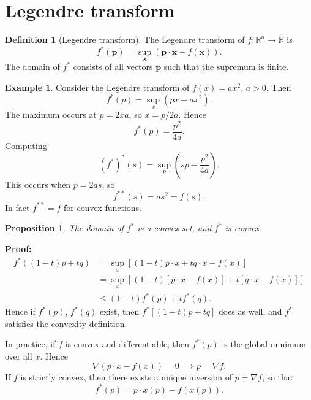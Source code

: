 \documentclass[12pt]{article}
\newtheorem{proposition}{Proposition}[section]
\theoremstyle{definition}
\newtheorem{definition}{Definition}[section]
\newtheorem{example}{Example}[section]
\theoremstyle{remark}
\begin{document}
\newpage

\section{Legendre transform}%
\label{sec:legendre_transform}

\begin{definition}[Legendre transform]
	The Legendre transform of $f: \mathbb{R}^{n} \to \mathbb{R}$ is
	\[
		f^{\ast}(\mathbf{p}) = \sup_{\mathbf{x}} (\mathbf{p} \cdot \mathbf{x} - f(\mathbf{x})) \tag{6.1}\label{eq:lt}
	.\]
	The domain of $f^{\ast}$ consists of all vectors $\mathbf{p}$ such that the supremum is finite.
\end{definition}

\begin{adjustbox}{minipage = \columnwidth - 25.5pt, margin=1em, frame=1pt, margin=0em}
\begin{example}
	Consider the Legendre transform of $f(x) = ax^2$, $a > 0$. Then
	\[
		f^{\ast}(p) = \sup_{x}(px - ax^2)
	.\]
	The maximum occurs at $p = 2xa$, so $x = p/2a$. Hence
	\[
		f^{\ast}(p) = \frac{p^2}{4a}
	.\]
	Computing
	\[
		(f^{\ast})^{\ast}(s) = \sup_{p}\left(sp - \frac{p^2}{4a}\right)
	.\]
	This occurs when $p = 2as$, so
	\[
		f^{\ast\ast}(s) = as^2 = f(s)
	.\]
	In fact $f^{\ast\ast} = f$ for convex functions.
\end{example}

\end{adjustbox}

\begin{proposition}
	The domain of $f^{\ast}$ is a convex set, and $f^{\ast}$ is convex.
\end{proposition}

\begin{adjustbox}{minipage = \columnwidth - 25.5pt, margin=1em, frame=1pt, margin=0em}
\textbf{Proof:}
\begin{align*}
	f^{\ast}((1 - t)p + tq) &= \sup_{x}[(1 - t)p \cdot x + t q \cdot x - f(x)] \\
				&= \sup_{x}\left[(1 - t)[p \cdot x - f(x)] + t[q \cdot x - f(x)]\right] \\
				&\leq (1 - t)f^{\ast}(p) + t f^{\ast}(q).
\end{align*}
Hence if $f^{\ast}(p)$, $f^{\ast}(q)$ exist, then $f^{\ast}[(1 - t)p + tq]$ does as well, and $f^{\ast}$ satisfies the convexity definition.
\end{adjustbox}

In practice, if $f$ is convex and differentiable, then $f^{\ast}(p)$ is the global minimum over all $x$. Hence
\[
	\nabla (p \cdot x - f(x)) = 0 \implies p = \nabla f
.\]
If $f$ is strictly convex, then there exists a unique inversion of $p = \nabla f$, so that
\[
	f^{\ast}(p) = p \cdot x(p) - f(x(p))
.\]
\end{document}
